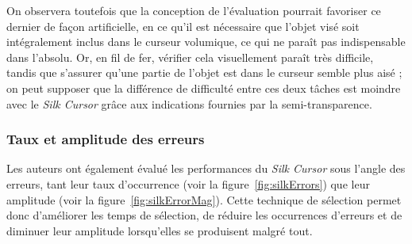 	On observera toutefois que la conception de l'évaluation pourrait favoriser ce dernier de façon artificielle, en ce qu'il est nécessaire que l'objet visé soit intégralement inclus dans le curseur volumique, ce qui ne paraît pas indispensable dans l'absolu. Or, en fil de fer, vérifier cela visuellement paraît très difficile, tandis que s'assurer qu'une partie de l'objet est dans le curseur semble plus aisé ; on peut supposer que la différence de difficulté entre ces deux tâches est moindre avec le \emph{Silk Cursor} grâce aux indications fournies par la semi-transparence.
	
	\subsubsection{Taux et amplitude des erreurs}
	Les auteurs ont également évalué les performances du \emph{Silk Cursor} sous l'angle des erreurs, tant leur taux d'occurrence (voir la figure~\ref{fig:silkErrors}) que leur amplitude (voir la figure~\ref{fig:silkErrorMag}). Cette technique de sélection permet donc d'améliorer les temps de sélection, de réduire les occurrences d'erreurs et de diminuer leur amplitude lorsqu'elles se produisent malgré tout.
	
